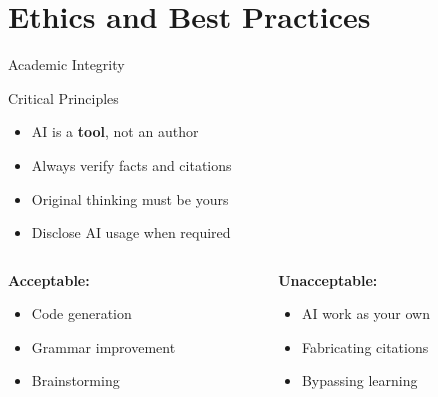 \documentclass[aspectratio=169]{beamer}
\begin{document}
	\section{Ethics and Best Practices}
	
	\begin{frame}{Academic Integrity}
		\begin{alertblock}{Critical Principles}
			\begin{itemize}
				\item AI is a \textbf{tool}, not an author
				\item Always verify facts and citations
				\item Original thinking must be yours
				\item Disclose AI usage when required
			\end{itemize}
		\end{alertblock}
		
		\vspace{0.5em}
		
		\begin{columns}[t]
			\begin{column}{0.48\textwidth}
				\textbf{Acceptable:}
				\begin{itemize}
					\item Code generation
					\item Grammar improvement
					\item Brainstorming
				\end{itemize}
			\end{column}
			
			\begin{column}{0.48\textwidth}
				\textbf{Unacceptable:}
				\begin{itemize}
					\item AI work as your own
					\item Fabricating citations
					\item Bypassing learning
				\end{itemize}
			\end{column}
		\end{columns}
	\end{frame}
	
\end{document}
